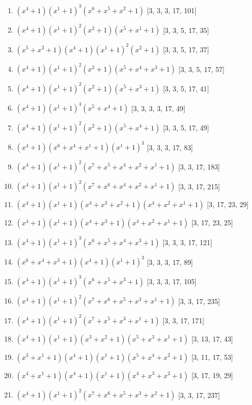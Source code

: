 \documentclass[10pt,twocolumn]{article}
\begin{document}
\begin{enumerate}
\item $(x^{4} + 1)(x^{1} + 1)^{3}(x^{6} + x^{5} + x^{2} + 1)$  [3, 3, 3, 17, 101]
\item $(x^{4} + 1)(x^{1} + 1)^{2}(x^{2} + 1)(x^{5} + x^{1} + 1)$  [3, 3, 5, 17, 35]
\item $(x^{5} + x^{2} + 1)(x^{4} + 1)(x^{1} + 1)^{2}(x^{2} + 1)$  [3, 3, 5, 17, 37]
\item $(x^{4} + 1)(x^{1} + 1)^{2}(x^{2} + 1)(x^{5} + x^{4} + x^{3} + 1)$  [3, 3, 5, 17, 57]
\item $(x^{4} + 1)(x^{1} + 1)^{2}(x^{2} + 1)(x^{5} + x^{3} + 1)$  [3, 3, 5, 17, 41]
\item $(x^{4} + 1)(x^{1} + 1)^{4}(x^{5} + x^{4} + 1)$  [3, 3, 3, 3, 17, 49]
\item $(x^{4} + 1)(x^{1} + 1)^{2}(x^{2} + 1)(x^{5} + x^{4} + 1)$  [3, 3, 5, 17, 49]
\item $(x^{4} + 1)(x^{6} + x^{4} + x^{1} + 1)(x^{1} + 1)^{3}$  [3, 3, 3, 17, 83]
\item $(x^{4} + 1)(x^{1} + 1)^{2}(x^{7} + x^{5} + x^{4} + x^{2} + x^{1} + 1)$  [3, 3, 17, 183]
\item $(x^{4} + 1)(x^{1} + 1)^{2}(x^{7} + x^{6} + x^{4} + x^{2} + x^{1} + 1)$  [3, 3, 17, 215]
\item $(x^{4} + 1)(x^{1} + 1)(x^{4} + x^{3} + x^{2} + 1)(x^{4} + x^{2} + x^{1} + 1)$  [3, 17, 23, 29]
\item $(x^{4} + 1)(x^{1} + 1)(x^{4} + x^{3} + 1)(x^{4} + x^{2} + x^{1} + 1)$  [3, 17, 23, 25]
\item $(x^{4} + 1)(x^{1} + 1)^{3}(x^{6} + x^{5} + x^{4} + x^{3} + 1)$  [3, 3, 3, 17, 121]
\item $(x^{6} + x^{4} + x^{3} + 1)(x^{4} + 1)(x^{1} + 1)^{3}$  [3, 3, 3, 17, 89]
\item $(x^{4} + 1)(x^{1} + 1)^{3}(x^{6} + x^{5} + x^{3} + 1)$  [3, 3, 3, 17, 105]
\item $(x^{4} + 1)(x^{1} + 1)^{2}(x^{7} + x^{6} + x^{5} + x^{3} + x^{1} + 1)$  [3, 3, 17, 235]
\item $(x^{4} + 1)(x^{1} + 1)^{2}(x^{7} + x^{5} + x^{3} + x^{1} + 1)$  [3, 3, 17, 171]
\item $(x^{4} + 1)(x^{1} + 1)(x^{3} + x^{2} + 1)(x^{5} + x^{3} + x^{1} + 1)$  [3, 13, 17, 43]
\item $(x^{3} + x^{1} + 1)(x^{4} + 1)(x^{1} + 1)(x^{5} + x^{4} + x^{2} + 1)$  [3, 11, 17, 53]
\item $(x^{4} + x^{1} + 1)(x^{4} + 1)(x^{1} + 1)(x^{4} + x^{3} + x^{2} + 1)$  [3, 17, 19, 29]
\item $(x^{4} + 1)(x^{1} + 1)^{2}(x^{7} + x^{6} + x^{5} + x^{3} + x^{2} + 1)$  [3, 3, 17, 237]

\end{enumerate}
\end{document}
